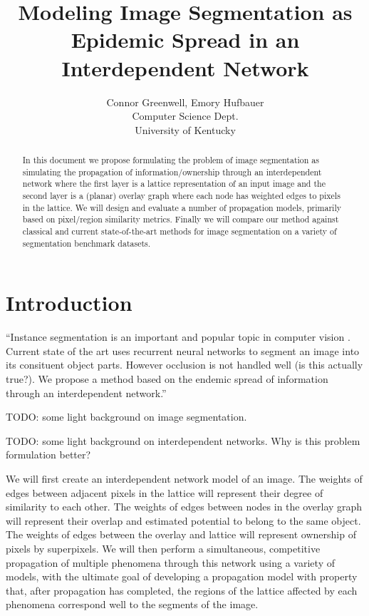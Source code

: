 \documentclass[twocolumn]{article}
\title{Modeling Image Segmentation as Epidemic Spread in an Interdependent Network}
\author{
  Connor Greenwell, Emory Hufbauer\\
  Computer Science Dept. \\
  University of Kentucky
}
\date{}
\newcommand{\todo}[1]{}
\renewcommand{\todo}[1]{{\color{red} TODO: {#1}}}
\begin{document}
\maketitle

\begin{abstract}
In this document we propose formulating the problem of image segmentation as
simulating the propagation of information/ownership through an interdependent
network where the first layer is a lattice representation of an input image and
the second layer is a (planar) overlay graph where each node has weighted edges
to pixels in the lattice. We will design and evaluate a number of propagation
models, primarily based on pixel/region similarity metrics. Finally we will
compare our method against classical and current state-of-the-art methods for
image segmentation on a variety of segmentation benchmark datasets. 
\end{abstract}

\section{Introduction}

``Instance segmentation is an important and popular topic in computer vision
\cite{newell2017associative, li2017fully, ren2017end}. Current state of the art
uses recurrent neural networks to segment an image into its consituent object
parts.  However occlusion is not handled well (is this actually true?). We
propose a method based on the endemic spread of information through an
interdependent network.'' 

\todo{some light background on image segmentation.}

\todo{some light background on interdependent networks. Why is this problem formulation better?}

We will first create an interdependent network model of an image. The
weights of edges between adjacent pixels in the lattice will represent
their degree of similarity to each other. The weights of edges between
nodes in the overlay graph will represent their overlap and estimated
potential to belong to the same object. The weights of edges between the
overlay and lattice will represent ownership of pixels by superpixels.
We will then perform a simultaneous, competitive propagation of multiple
phenomena through this network using a variety of models, with the
ultimate goal of developing a propagation model with property that,
after propagation has completed, the regions of the lattice affected by
each phenomena correspond well to the segments of the image.
\end{document}
